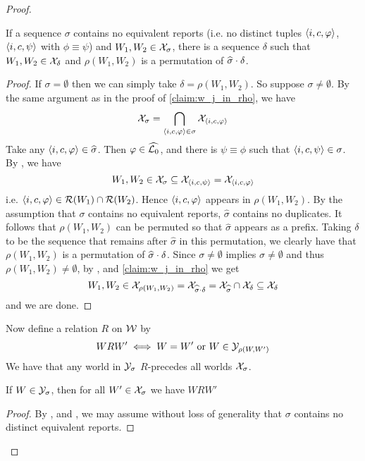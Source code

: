 \begin{proof}
    \begin{claim}
        \label{claim:exists_delta}
        If a sequence $\sigma$ contains no equivalent reports (i.e. no distinct
        tuples $\langle {i, c, \varphi} \rangle$, $\langle {i, c, \psi} \rangle$ with $\phi \equiv
        \psi$) and $W_1, W_2 \in \mathcal{X}_\sigma$, there is a sequence $\delta$ such
        that $W_1, W_2 \in \mathcal{X}_\delta$ and $\rho(W_1, W_2)$ is a permutation of
        $\widehat{\sigma} \cdot \delta$.
    \end{claim}
    \begin{proof}
        If $\sigma = \emptyset$ then we can simply take $\delta = \rho(W_1,
        W_2)$. So suppose $\sigma \ne \emptyset$. By the same argument as in
        the proof of \cref{claim:w_j_in_rho}, we have
        \[
            \mathcal{X}_\sigma = \bigcap_{\langle {i, c, \varphi} \rangle \in \sigma}{\mathcal{X}_{\langle {i, c,
            \varphi} \rangle}}
        \]
        Take any $\langle {i, c, \varphi} \rangle \in \widehat{\sigma}$. Then $\varphi \in
        \widehat{\mathcal{L}{}_0}$, and there is $\psi \equiv \phi$ such that $\langle {i,
        c, \psi} \rangle \in \sigma$. By \equivpost{}, we have
        \[
            W_1, W_2
            \in \mathcal{X}_\sigma
            \subseteq \mathcal{X}_{\langle {i, c, \psi} \rangle}
            = \mathcal{X}_{\langle {i, c, \varphi} \rangle}
        \]
        i.e. $\langle {i, c, \varphi} \rangle \in \mathcal{R}(W_1) \cap \mathcal{R}(W_2)$. Hence
        $\langle {i, c, \varphi} \rangle$ appears in $\rho(W_1, W_2)$. By the assumption
        that $\sigma$ contains no equivalent reports, $\widehat{\sigma}$
        contains no duplicates. It follows that $\rho(W_1, W_2)$ can be
        permuted so that $\widehat{\sigma}$ appears as a prefix. Taking
        $\delta$ to be the sequence that remains after $\widehat{\sigma}$ in
        this permutation, we clearly have that $\rho(W_1, W_2)$ is a
        permutation of $\widehat{\sigma} \cdot \delta$. Since $\sigma \ne
        \emptyset$ implies $\widehat{\sigma} \ne \emptyset$ and thus $\rho(W_1,
        W_2) \ne \emptyset$, by \rearr{}, \kconj{} and
        \cref{claim:w_j_in_rho} we get
        \[
            W_1, W_2 \in \mathcal{X}_{\rho(W_1, W_2)}
            = \mathcal{X}_{\widehat{\sigma} \cdot \delta}
            = \mathcal{X}_{\widehat{\sigma}} \cap \mathcal{X}_\delta
            \subseteq \mathcal{X}_\delta
        \]
        and we are done.
    \end{proof}

Now define a relation $R$ on $\mathcal{W}$ by
\[
    W R W' \iff W = W' \text{ or } W \in \mathcal{Y}_{\rho(W, W')}
\]
We have that any world in $\mathcal{Y}_\sigma$ $R$-precedes all worlds $\mathcal{X}_\sigma$.

    \begin{claim}
        \label{claim:y_subset_minimal}
        If $W \in \mathcal{Y}_\sigma$, then for all $W' \in \mathcal{X}_\sigma$ we have $W R W'$
    \end{claim}
    \begin{proof}
        By \rearr{}, \equivpost{} and
        \duprem{}, we may assume without loss of generality that
        $\sigma$ contains no distinct equivalent reports.


\end{proof}
\end{proof}
